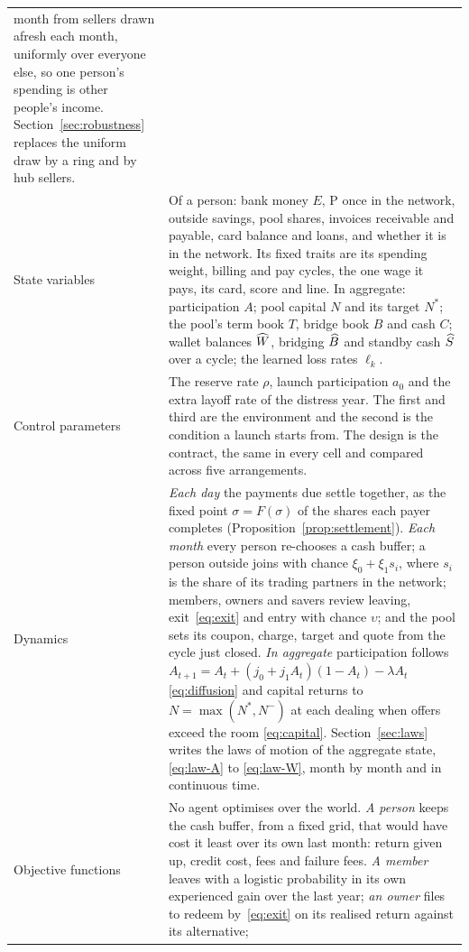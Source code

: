 \begin{table}[p]
\begin{tabularx}{\textwidth}{@{}p{}X@{}}
  month from sellers drawn afresh each month, uniformly over everyone else, so one person's spending is other
  people's income. Section~\ref{sec:robustness} replaces the uniform draw by a ring and by hub sellers. \\
\addlinespace
State variables & Of a person: bank money $E$, P once in the network, outside savings, pool shares, invoices
  receivable and payable, card balance and loans, and whether it is in the network. Its fixed traits are its
  spending weight, billing and pay cycles, the one wage it pays, its card, score and line. In aggregate:
  participation $A$; pool capital $N$ and its target $N^{*}$; the pool's term book $T$, bridge book $B$ and cash $C$;
  wallet balances $\widehat{W}$, bridging $\widehat{B}$ and standby cash $\widehat{S}$ over a cycle; the learned loss rates
  $\ell_{k}$. \\
\addlinespace
Control parameters & The reserve rate $\rho$, launch participation $a_{0}$ and the extra layoff rate of the
  distress year. The first and third are the environment and the second is the condition a launch starts from. The
  design is the contract, the same in every cell and compared across five arrangements. \\
\addlinespace
Dynamics & \emph{Each day} the payments due settle together, as the fixed point $\sigma = F(\sigma)$ of the shares each
  payer completes (Proposition~\ref{prop:settlement}).
  \emph{Each month} every person re-chooses a cash buffer; a person outside joins with chance
  $\xi_{0} + \xi_{1}s_{i}$, where $s_{i}$ is the share of its trading partners in the network; members, owners
  and savers review leaving, exit~\eqref{eq:exit} and entry with chance $\upsilon$; and the pool sets its coupon,
  charge, target and quote from the cycle just closed.
  \emph{In aggregate} participation follows $A_{t+1} = A_{t} + (j_{0} + j_{1}A_{t})(1 - A_{t}) - \lambda A_{t}$
  \eqref{eq:diffusion} and capital returns to $N = \max(N^{*}, N^{-})$ at each dealing when offers exceed the room
  \eqref{eq:capital}. Section~\ref{sec:laws} writes the laws of motion of the aggregate state, \eqref{eq:law-A} to
  \eqref{eq:law-W}, month by month and in continuous time. \\
\addlinespace
Objective functions & No agent optimises over the world.
  \emph{A person} keeps the cash buffer, from a fixed grid, that would have cost it least over its own last month:
  return given up, credit cost, fees and failure fees.
  \emph{A member} leaves with a logistic probability in its own experienced gain over the last year;
  \emph{an owner} files to redeem by~\eqref{eq:exit} on its realised return against its alternative;

\end{tabularx}
\end{table}
